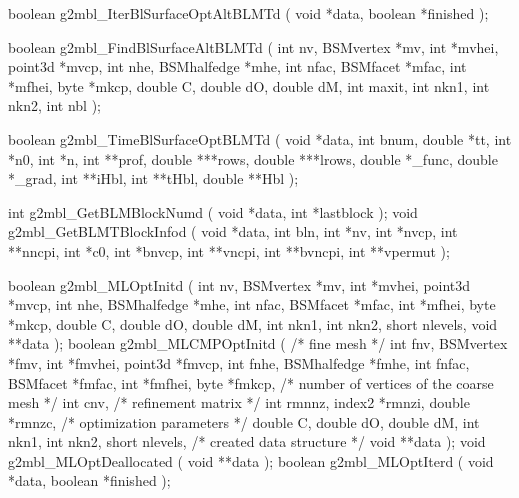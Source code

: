 \begin{listingC}
boolean g2mbl_IterBlSurfaceOptAltBLMTd ( void *data, boolean *finished );
\end{listingC}

\begin{listingC}
boolean g2mbl_FindBlSurfaceAltBLMTd ( int nv, BSMvertex *mv, int *mvhei,
                                      point3d *mvcp, int nhe, BSMhalfedge *mhe,
                                      int nfac, BSMfacet *mfac, int *mfhei,
                                      byte *mkcp,
                                      double C, double dO, double dM,
                                      int maxit, int nkn1, int nkn2, int nbl );
\end{listingC}

\begin{listingC}
boolean g2mbl_TimeBlSurfaceOptBLMTd ( void *data, int bnum, double *tt,
                                      int *n0, int *n, int **prof,
                                      double ***rows, double ***lrows,
                                      double *_func, double *_grad,   
                                      int **iHbl, int **tHbl, double **Hbl );
\end{listingC}

\begin{listingC}
int g2mbl_GetBLMBlockNumd ( void *data, int *lastblock );
void g2mbl_GetBLMTBlockInfod ( void *data,
                               int bln, int *nv, int *nvcp, int **nncpi,
                               int *c0, int *bnvcp,
                               int **vncpi, int **bvncpi, int **vpermut );
\end{listingC}

\begin{listingC}
boolean g2mbl_MLOptInitd ( int nv, BSMvertex *mv, int *mvhei, point3d *mvcp,
                           int nhe, BSMhalfedge *mhe,
                           int nfac, BSMfacet *mfac, int *mfhei,
                           byte *mkcp,
                           double C, double dO, double dM,
                           int nkn1, int nkn2, short nlevels, void **data );
boolean g2mbl_MLCMPOptInitd ( /* fine mesh */
                    int fnv, BSMvertex *fmv, int *fmvhei, point3d *fmvcp,
                    int fnhe, BSMhalfedge *fmhe,
                    int fnfac, BSMfacet *fmfac, int *fmfhei,
                    byte *fmkcp,
                           /* number of vertices of the coarse mesh */
                    int cnv,
                           /* refinement matrix */
                    int rmnnz, index2 *rmnzi, double *rmnzc,
                           /* optimization parameters */
                    double C, double dO, double dM,
                    int nkn1, int nkn2, short nlevels,
                           /* created data structure */
                    void **data );
void g2mbl_MLOptDeallocated ( void **data );
boolean g2mbl_MLOptIterd ( void *data, boolean *finished );
\end{listingC}

